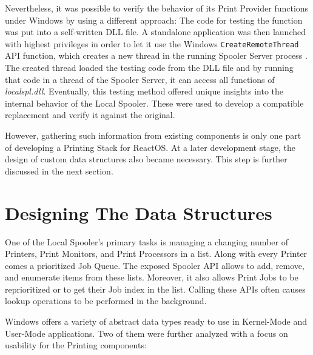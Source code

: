 Nevertheless, it was possible to verify the behavior of its Print Provider functions under Windows by using a different approach:
The code for testing the function was put into a self-written \gls{DLL} file.
A standalone application was then launched with highest privileges in order to let it use the Windows \texttt{CreateRemoteThread} \gls{API} function, which creates a new thread in the running Spooler Server process \cite{msdn2015createremotethread}.
The created thread loaded the testing code from the \gls{DLL} file and by running that code in a thread of the Spooler Server, it can access all functions of \emph{localspl.dll}.
Eventually, this testing method offered unique insights into the internal behavior of the Local Spooler.
These were used to develop a compatible replacement and verify it against the original.

However, gathering such information from existing components is only one part of developing a Printing Stack for ReactOS.
At a later development stage, the design of custom data structures also became necessary.
This step is further discussed in the next section.


\section{Designing The Data Structures}
One of the Local Spooler's primary tasks is managing a changing number of Printers, Print Monitors, and Print Processors in a list.
Along with every Printer comes a prioritized Job Queue.
The exposed Spooler \gls{API} allows to add, remove, and enumerate items from these lists.
Moreover, it also allows Print Jobs to be reprioritized or to get their Job index in the list.
Calling these \glspl{API} often causes lookup operations to be performed in the background.

Windows offers a variety of abstract data types ready to use in Kernel-Mode and User-Mode applications.
Two of them were further analyzed with a focus on usability for the Printing components:

